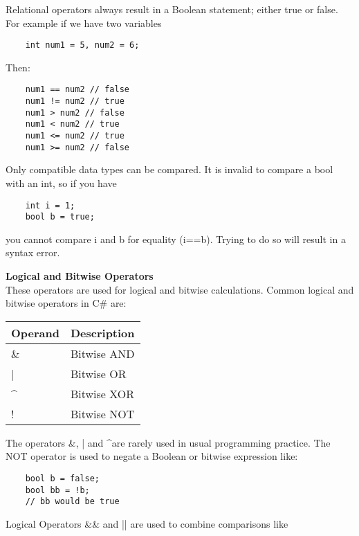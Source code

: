 Relational operators always result in a Boolean statement; either true or false. For example if we have two
variables

\begin{lstlisting}
    int num1 = 5, num2 = 6;    
\end{lstlisting}

Then:

\begin{lstlisting}
    num1 == num2 // false
    num1 != num2 // true
    num1 > num2 // false
    num1 < num2 // true
    num1 <= num2 // true
    num1 >= num2 // false    
\end{lstlisting}

Only compatible data types can be compared. It is invalid to compare a bool with an int, so if you have

\begin{lstlisting}
    int i = 1;
    bool b = true;    
\end{lstlisting}

you cannot compare i and b for equality (i==b). Trying to do so will result in a syntax error.

\textbf{Logical and Bitwise Operators}\\
These operators are used for logical and bitwise calculations. Common logical and bitwise operators in C\# are:

\begin{center}
    \begin{tabular}{ | m{5em} | m{10cm} | } 
    \hline
    Operand & Description \\
    \hline
    \& & Bitwise AND\\
    | & Bitwise OR\\
    \textasciicircum & Bitwise XOR\\
    ! & Bitwise NOT\\
    \hline
    \end{tabular}
\end{center}

The operators \&, | and \textasciicircum are rarely used in usual programming practice. The NOT operator is used to negate a
Boolean or bitwise expression like:

\begin{lstlisting}
    bool b = false;
    bool bb = !b;
    // bb would be true        
\end{lstlisting}


Logical Operators \&\& and || are used to combine comparisons like


